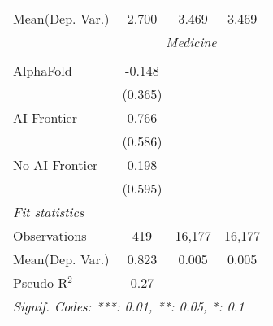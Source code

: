 \begin{tabular}{lccc}
Mean(Dep. Var.) & 2.700 & 3.469 & 3.469 \\
 & \multicolumn{3}{c}{\textit{Medicine}} \\ \\
   AlphaFold      & -0.148   &        &   \\   
                  & (0.365)  &        &   \\   
   AI Frontier    & 0.766    &        &   \\   
                  & (0.586)  &        &   \\   
   No AI Frontier & 0.198    &        &   \\   
                  & (0.595)  &        &   \\   
   \midrule
   \emph{Fit statistics}\\
   Observations   & 419      & 16,177 & 16,177\\  
Mean(Dep. Var.) & 0.823 & 0.005 & 0.005 \\
   Pseudo R$^2$   & 0.27     &        & \\  
   \midrule \midrule
   \multicolumn{4}{l}{\emph{Signif. Codes: ***: 0.01, **: 0.05, *: 0.1}}\\
\end{tabular}
\par\endgroup
